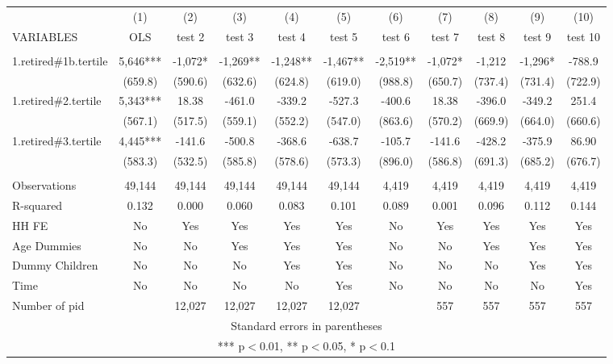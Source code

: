 \begin{tabular}{lcccccccccc} \hline
 & (1) & (2) & (3) & (4) & (5) & (6) & (7) & (8) & (9) & (10) \\
VARIABLES & OLS & test 2 & test 3 & test 4 & test 5 & test 6 & test 7 & test 8 & test 9 & test 10 \\ \hline
 &  &  &  &  &  &  &  &  &  &  \\
1.retired\#1b.tertile & 5,646*** & -1,072* & -1,269** & -1,248** & -1,467** & -2,519** & -1,072* & -1,212 & -1,296* & -788.9 \\
 & (659.8) & (590.6) & (632.6) & (624.8) & (619.0) & (988.8) & (650.7) & (737.4) & (731.4) & (722.9) \\
1.retired\#2.tertile & 5,343*** & 18.38 & -461.0 & -339.2 & -527.3 & -400.6 & 18.38 & -396.0 & -349.2 & 251.4 \\
 & (567.1) & (517.5) & (559.1) & (552.2) & (547.0) & (863.6) & (570.2) & (669.9) & (664.0) & (660.6) \\
1.retired\#3.tertile & 4,445*** & -141.6 & -500.8 & -368.6 & -638.7 & -105.7 & -141.6 & -428.2 & -375.9 & 86.90 \\
 & (583.3) & (532.5) & (585.8) & (578.6) & (573.3) & (896.0) & (586.8) & (691.3) & (685.2) & (676.7) \\
 &  &  &  &  &  &  &  &  &  &  \\
Observations & 49,144 & 49,144 & 49,144 & 49,144 & 49,144 & 4,419 & 4,419 & 4,419 & 4,419 & 4,419 \\
R-squared & 0.132 & 0.000 & 0.060 & 0.083 & 0.101 & 0.089 & 0.001 & 0.096 & 0.112 & 0.144 \\
HH FE & No & Yes & Yes & Yes & Yes & No & Yes & Yes & Yes & Yes \\
Age Dummies & No & No & Yes & Yes & Yes & No & No & Yes & Yes & Yes \\
Dummy Children & No & No & No & Yes & Yes & No & No & No & Yes & Yes \\
Time & No & No & No & No & Yes & No & No & No & No & Yes \\
 Number of pid &  & 12,027 & 12,027 & 12,027 & 12,027 &  & 557 & 557 & 557 & 557 \\ \hline
\multicolumn{11}{c}{ Standard errors in parentheses} \\
\multicolumn{11}{c}{ *** p$<$0.01, ** p$<$0.05, * p$<$0.1} \\
\end{tabular}
